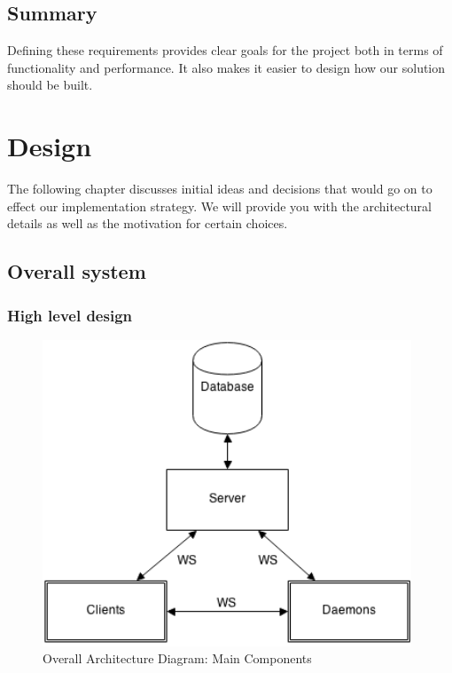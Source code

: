 \documentclass{l3proj}
\begin{document}
\section{Summary}

Defining these requirements provides clear goals for the project both in terms of functionality and performance. It also makes it easier to design how our solution should be built. 



\chapter{Design}
\label{design}

The following chapter discusses initial ideas and decisions that would go on to effect our implementation strategy. We will provide you with the architectural details as well as the motivation for certain choices.


\section{Overall system}

\subsection{High level design}

\begin{figure}[H]
\centering
\includegraphics[width=110mm]{images/ArchitectureDiagram.png}
\caption{Overall Architecture Diagram: Main Components}
\end{figure}
\end{document}

